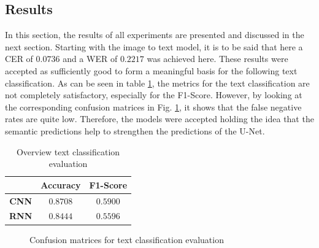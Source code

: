 \documentclass[conference]{IEEEtran}
\begin{document}
\subsection{Results}
In this section, the results of all experiments are presented and discussed in the next section. Starting with the image to text model, it is to be said that here a CER of $0.0736$ and a WER of $0.2217$ was achieved here. These results were accepted as sufficiently good to form a meaningful basis for the following text classification. As can be seen in table \ref{results_class}, the metrics for the text classification are not completely satisfactory, especially for the F1-Score. However, by looking at the corresponding confusion matrices in Fig. \ref{conf_mat}, it shows that the false negative rates are quite low. Therefore, the models were accepted holding the idea that the semantic predictions help to strengthen the predictions of the U-Net.
\begin{table}[htbp]
\caption{Overview text classification evaluation}
\begin{center}
\begin{tabular}{|c|c|c|}
\hline
\textbf{} & Accuracy & F1-Score \\
\hline
\textbf{CNN} & \boldmath$0.8708$ & \boldmath$0.5900$ \\
\hline
\textbf{RNN} & $0.8444$ & $0.5596$ \\
\hline
\end{tabular}
\label{results_class}
\end{center}
\end{table}
\begin{figure}[htbp]
    \centering
    \caption{Confusion matrices for text classification evaluation}
    \label{conf_mat}
\end{figure}
\end{document}
